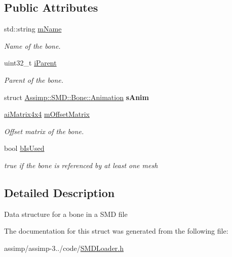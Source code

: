 \subsection*{Public Attributes}
\begin{DoxyCompactItemize}
\item 
\hypertarget{struct_assimp_1_1_s_m_d_1_1_bone_a69a0a60e8954e35008270f30685b9888}{std\+::string \hyperlink{struct_assimp_1_1_s_m_d_1_1_bone_a69a0a60e8954e35008270f30685b9888}{m\+Name}}\label{struct_assimp_1_1_s_m_d_1_1_bone_a69a0a60e8954e35008270f30685b9888}

\begin{DoxyCompactList}\small\item\em Name of the bone. \end{DoxyCompactList}\item 
\hypertarget{struct_assimp_1_1_s_m_d_1_1_bone_af139165c3db4af3df69eee0b3ea43cbc}{uint32\+\_\+t \hyperlink{struct_assimp_1_1_s_m_d_1_1_bone_af139165c3db4af3df69eee0b3ea43cbc}{i\+Parent}}\label{struct_assimp_1_1_s_m_d_1_1_bone_af139165c3db4af3df69eee0b3ea43cbc}

\begin{DoxyCompactList}\small\item\em Parent of the bone. \end{DoxyCompactList}\item 
\hypertarget{struct_assimp_1_1_s_m_d_1_1_bone_af496dddbd6ed0d6a8b217dba86a7860d}{struct \hyperlink{struct_assimp_1_1_s_m_d_1_1_bone_1_1_animation}{Assimp\+::\+S\+M\+D\+::\+Bone\+::\+Animation} {\bfseries s\+Anim}}\label{struct_assimp_1_1_s_m_d_1_1_bone_af496dddbd6ed0d6a8b217dba86a7860d}

\item 
\hypertarget{struct_assimp_1_1_s_m_d_1_1_bone_a37bf8b55c19a7e0bbfce4e37c8403586}{\hyperlink{structai_matrix4x4}{ai\+Matrix4x4} \hyperlink{struct_assimp_1_1_s_m_d_1_1_bone_a37bf8b55c19a7e0bbfce4e37c8403586}{m\+Offset\+Matrix}}\label{struct_assimp_1_1_s_m_d_1_1_bone_a37bf8b55c19a7e0bbfce4e37c8403586}

\begin{DoxyCompactList}\small\item\em Offset matrix of the bone. \end{DoxyCompactList}\item 
\hypertarget{struct_assimp_1_1_s_m_d_1_1_bone_acbe5cfd103d9eb41173a631dfeee5614}{bool \hyperlink{struct_assimp_1_1_s_m_d_1_1_bone_acbe5cfd103d9eb41173a631dfeee5614}{b\+Is\+Used}}\label{struct_assimp_1_1_s_m_d_1_1_bone_acbe5cfd103d9eb41173a631dfeee5614}

\begin{DoxyCompactList}\small\item\em true if the bone is referenced by at least one mesh \end{DoxyCompactList}\end{DoxyCompactItemize}


\subsection{Detailed Description}
Data structure for a bone in a S\+M\+D file 

The documentation for this struct was generated from the following file\+:\begin{DoxyCompactItemize}
\item 
assimp/assimp-\/3../code/\hyperlink{_s_m_d_loader_8h}{S\+M\+D\+Loader.\+h}\end{DoxyCompactItemize}
